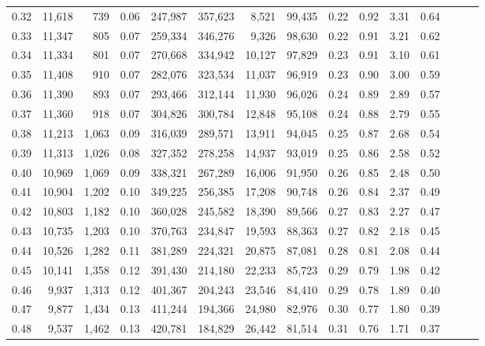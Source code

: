 \begin{tabular}{rrrrrrrrrrrrrrr}
0.32 &  11,618 &    739 &  0.06 &  247,987 &  357,623 &    8,521 &   99,435 &  0.22 &  0.92 &  3.31 &      0.64 \\
0.33 &  11,347 &    805 &  0.07 &  259,334 &  346,276 &    9,326 &   98,630 &  0.22 &  0.91 &  3.21 &      0.62 \\
0.34 &  11,334 &    801 &  0.07 &  270,668 &  334,942 &   10,127 &   97,829 &  0.23 &  0.91 &  3.10 &      0.61 \\
0.35 &  11,408 &    910 &  0.07 &  282,076 &  323,534 &   11,037 &   96,919 &  0.23 &  0.90 &  3.00 &      0.59 \\
0.36 &  11,390 &    893 &  0.07 &  293,466 &  312,144 &   11,930 &   96,026 &  0.24 &  0.89 &  2.89 &      0.57 \\
0.37 &  11,360 &    918 &  0.07 &  304,826 &  300,784 &   12,848 &   95,108 &  0.24 &  0.88 &  2.79 &      0.55 \\
0.38 &  11,213 &  1,063 &  0.09 &  316,039 &  289,571 &   13,911 &   94,045 &  0.25 &  0.87 &  2.68 &      0.54 \\
0.39 &  11,313 &  1,026 &  0.08 &  327,352 &  278,258 &   14,937 &   93,019 &  0.25 &  0.86 &  2.58 &      0.52 \\
0.40 &  10,969 &  1,069 &  0.09 &  338,321 &  267,289 &   16,006 &   91,950 &  0.26 &  0.85 &  2.48 &      0.50 \\
0.41 &  10,904 &  1,202 &  0.10 &  349,225 &  256,385 &   17,208 &   90,748 &  0.26 &  0.84 &  2.37 &      0.49 \\
0.42 &  10,803 &  1,182 &  0.10 &  360,028 &  245,582 &   18,390 &   89,566 &  0.27 &  0.83 &  2.27 &      0.47 \\
0.43 &  10,735 &  1,203 &  0.10 &  370,763 &  234,847 &   19,593 &   88,363 &  0.27 &  0.82 &  2.18 &      0.45 \\
0.44 &  10,526 &  1,282 &  0.11 &  381,289 &  224,321 &   20,875 &   87,081 &  0.28 &  0.81 &  2.08 &      0.44 \\
0.45 &  10,141 &  1,358 &  0.12 &  391,430 &  214,180 &   22,233 &   85,723 &  0.29 &  0.79 &  1.98 &      0.42 \\
0.46 &   9,937 &  1,313 &  0.12 &  401,367 &  204,243 &   23,546 &   84,410 &  0.29 &  0.78 &  1.89 &      0.40 \\
0.47 &   9,877 &  1,434 &  0.13 &  411,244 &  194,366 &   24,980 &   82,976 &  0.30 &  0.77 &  1.80 &      0.39 \\
0.48 &   9,537 &  1,462 &  0.13 &  420,781 &  184,829 &   26,442 &   81,514 &  0.31 &  0.76 &  1.71 &      0.37 \\

\end{tabular}
